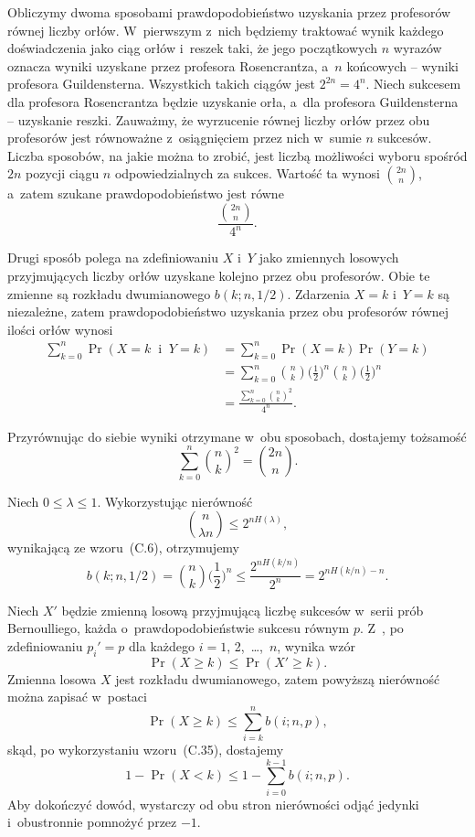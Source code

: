 \exercise %
Obliczymy dwoma sposobami prawdopodobieństwo uzyskania przez profesorów równej liczby orłów. W~pierwszym z~nich będziemy traktować wynik każdego doświadczenia jako  ciąg orłów i~reszek taki, że jego początkowych $n$ wyrazów oznacza wyniki uzyskane przez profesora Rosencrantza, a~$n$ końcowych -- wyniki profesora Guildensterna. Wszystkich takich ciągów jest $2^{2n}=4^n$. Niech sukcesem dla profesora Rosencrantza będzie uzyskanie orła, a~dla profesora Guildensterna -- uzyskanie reszki. Zauważmy, że wyrzucenie równej liczby orłów przez obu profesorów jest równoważne z~osiągnięciem przez nich w~sumie $n$ sukcesów. Liczba sposobów, na jakie można to zrobić, jest liczbą możliwości wyboru spośród $2n$ pozycji ciągu $n$ odpowiedzialnych za sukces. Wartość ta wynosi $\binom{2n}{n}$, a~zatem szukane prawdopodobieństwo jest równe
\[
	\frac{\binom{2n}{n}}{4^n}.
\]

Drugi sposób polega na zdefiniowaniu $X$ i~$Y$ jako zmiennych losowych przyjmujących liczby orłów uzyskane kolejno przez obu profesorów. Obie te zmienne są rozkładu dwumianowego $b(k;n,1/2)$. Zdarzenia $X=k$ i~$Y=k$ są niezależne, zatem prawdopodobieństwo uzyskania przez obu profesorów równej ilości orłów wynosi
\begin{align*}
	\sum_{k=0}^n\Pr(X=k\;\;\text{i}\;\;Y=k) &= \sum_{k=0}^n\Pr(X=k)\Pr(Y=k) \\
	&= \sum_{k=0}^n\binom{n}{k}\biggl(\frac{1}{2}\biggr)^n\binom{n}{k}\biggl(\frac{1}{2}\biggr)^n \\
	&= \frac{\sum_{k=0}^n\binom{n}{k}^2}{4^n}.
\end{align*}

Przyrównując do siebie wyniki otrzymane w~obu sposobach, dostajemy tożsamość
\[
	\sum_{k=0}^n\binom{n}{k}^2 = \binom{2n}{n}.
\]

\exercise %
Niech $0\le\lambda\le1$. Wykorzystując nierówność
\[
	\binom{n}{\lambda n} \le 2^{nH(\lambda)},
\]
wynikającą ze wzoru~(C.6), otrzymujemy
\[
	b(k;n,1/2) = \binom{n}{k}\biggl(\frac{1}{2}\biggr)^n \le \frac{2^{nH(k/n)}}{2^n} = 2^{nH(k/n)-n}.
\]

\exercise %

\noindent Niech $X'$ będzie zmienną losową przyjmującą liczbę sukcesów w~serii prób Bernoulliego, każda o~prawdopodobieństwie sukcesu równym $p$. Z~, po zdefiniowaniu $p_i'=p$ dla każdego $i=1$, 2,~\dots,~$n$, wynika wzór
\[
    \Pr(X\ge k) \le \Pr(X'\ge k).
\]
Zmienna losowa $X$ jest rozkładu dwumianowego, zatem powyższą nierówność można zapisać w~postaci
\[
    \Pr(X\ge k) \le \sum_{i=k}^nb(i;n,p),
\]
skąd, po wykorzystaniu wzoru~(C.35), dostajemy
\[
    1-\Pr(X<k) \le 1-\sum_{i=0}^{k-1}b(i;n,p).
\]
Aby dokończyć dowód, wystarczy od obu stron nierówności odjąć jedynki i~obustronnie pomnożyć przez $-1$.


